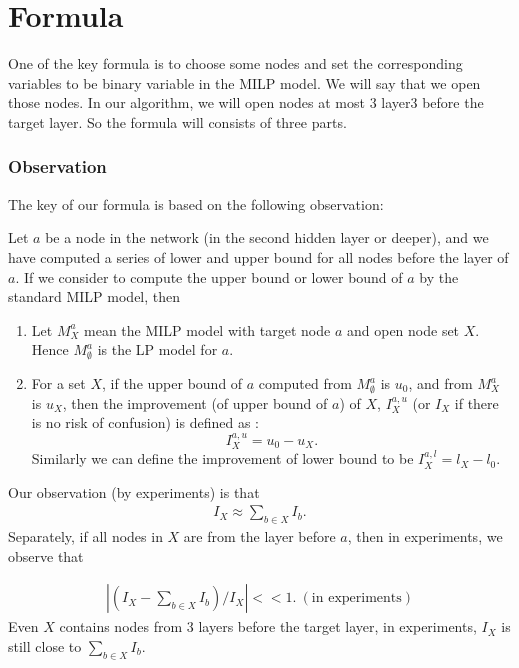 \section*{Formula}

One of the key formula is to choose some nodes and set the corresponding variables to be binary variable in the MILP model. We will say that we open those nodes. In our algorithm, we will open nodes at most 3 layer3 before the target layer. So the formula will consists of three parts.

\subsubsection*{Observation}

The key of our formula is based on the following observation:

\begin{definition}[Improvement]
	
	Let $a$ be a node in the network (in the second hidden layer or deeper), and we have computed a series of lower and upper bound for all nodes before the layer of $a$. If we consider to compute the upper bound or lower bound of $a$ by the standard MILP model, then
	
	\begin{enumerate}
		\item Let $M^a_X$ mean the MILP model with target node $a$ and open node set $X$. Hence $M^a_{\emptyset}$ is the LP model for $a$.
		
		\item For a set $X$, if the upper bound of $a$ computed from $M^a_{\emptyset}$ is $u_0$, and from $M^a_X$ is $u_X$, then the improvement (of upper bound of $a$) of $X$, $I_X^{a,u}$ (or $I_X$ if there is no risk of confusion) is defined as : $$I_X^{a,u} = u_0-u_X.$$ Similarly we can define the improvement of lower bound to be $I_X^{a,l} = l_X-l_0$.
	\end{enumerate}
\end{definition}



Our observation (by experiments) is that \begin{align*}
	I_X \approx \sum_{b\in X} I_b.
\end{align*} Separately, if all nodes in $X$ are from the layer before $a$, then in experiments, we observe that 

\begin{align}
	|(I_X - \sum_{b\in X} I_b)/I_X| << 1. \ (\text{in experiments})
\end{align} Even $X$ contains nodes from 3 layers before the target layer, in experiments, $I_X$ is still close to $\sum_{b\in X} I_b$.

